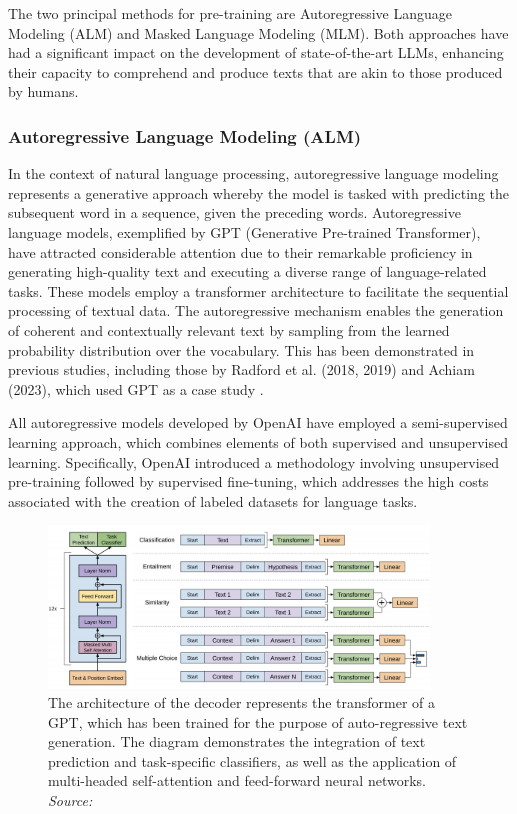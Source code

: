 The two principal methods for pre-training are Autoregressive Language Modeling (ALM) and Masked Language Modeling (MLM). Both approaches have had a significant impact on the development of state-of-the-art LLMs, enhancing their capacity to comprehend and produce texts that are akin to those produced by humans.

\subsubsection{Autoregressive Language Modeling (ALM)}

In the context of natural language processing, autoregressive language modeling represents a generative approach whereby the model is tasked with predicting the subsequent word in a sequence, given the preceding words. Autoregressive language models, exemplified by GPT (Generative Pre-trained Transformer), have attracted considerable attention due to their remarkable proficiency in generating high-quality text and executing a diverse range of language-related tasks. These models employ a transformer architecture to facilitate the sequential processing of textual data. The autoregressive mechanism enables the generation of coherent and contextually relevant text by sampling from the learned probability distribution over the vocabulary. This has been demonstrated in previous studies, including those by Radford et al. (2018, 2019) and Achiam (2023), which used GPT as a case study \cite{radford2018improving, radford2019language, achiam2023gpt}.

All autoregressive models developed by OpenAI have employed a semi-supervised learning approach, which combines elements of both supervised and unsupervised learning. Specifically, OpenAI introduced a methodology involving unsupervised pre-training followed by supervised fine-tuning, which addresses the high costs associated with the creation of labeled datasets for language tasks.

\begin{figure}[h]
    \centering
    \includegraphics[width=0.9\textwidth]{images/llms/gpt.png}
    \caption{The architecture of the decoder represents the transformer of a GPT, which has been trained for the purpose of auto-regressive text generation. The diagram demonstrates the integration of text prediction and task-specific classifiers, as well as the application of multi-headed self-attention and feed-forward neural networks. \textit{Source:} \cite{radford2018improving}}
    \label{fig:transformer_architecture}
\end{figure}

